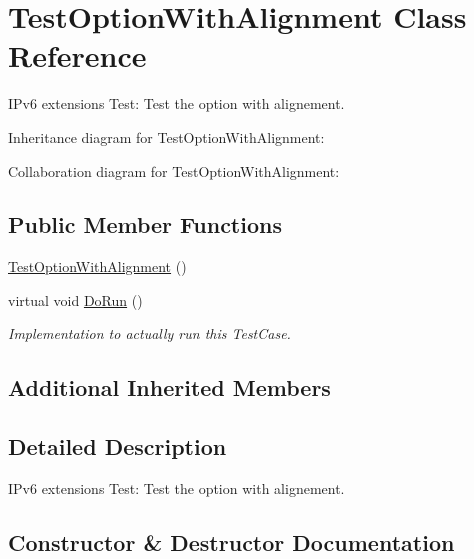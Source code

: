 \hypertarget{classTestOptionWithAlignment}{}\section{Test\+Option\+With\+Alignment Class Reference}
\label{classTestOptionWithAlignment}


I\+Pv6 extensions Test\+: Test the option with alignement.  




Inheritance diagram for Test\+Option\+With\+Alignment\+:


Collaboration diagram for Test\+Option\+With\+Alignment\+:
\subsection*{Public Member Functions}
\begin{DoxyCompactItemize}
\item 
\hyperlink{classTestOptionWithAlignment_ab6a9df21bc6ef5da7b245a6d9c6a6602}{Test\+Option\+With\+Alignment} ()
\item 
virtual void \hyperlink{classTestOptionWithAlignment_ae7937fcdd2ae8bc2790c5d7841ca22cb}{Do\+Run} ()
\begin{DoxyCompactList}\small\item\em Implementation to actually run this Test\+Case. \end{DoxyCompactList}\end{DoxyCompactItemize}
\subsection*{Additional Inherited Members}


\subsection{Detailed Description}
I\+Pv6 extensions Test\+: Test the option with alignement. 

\subsection{Constructor \& Destructor Documentation}
